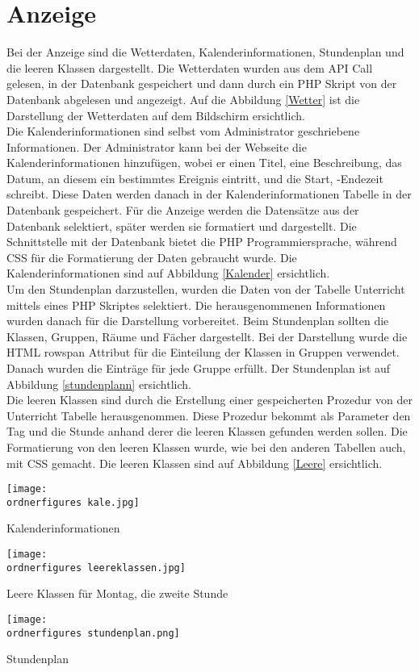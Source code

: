 \section{Anzeige}
Bei der Anzeige sind die Wetterdaten, Kalenderinformationen, Stundenplan und die leeren Klassen dargestellt. Die Wetterdaten wurden aus dem API Call gelesen, in der Datenbank gespeichert und dann durch ein PHP Skript von der Datenbank abgelesen und angezeigt. Auf die Abbildung \ref{Wetter} ist die Darstellung der Wetterdaten auf dem Bildschirm ersichtlich. \\
Die Kalenderinformationen sind selbst vom Administrator geschriebene Informationen. Der Administrator kann bei der Webseite die Kalenderinformationen hinzuf\"ugen, wobei er einen Titel, eine Beschreibung, das Datum, an diesem ein bestimmtes Ereignis eintritt, und die Start, -Endezeit schreibt. Diese Daten werden danach in der Kalenderinformationen Tabelle in der Datenbank gespeichert. F\"ur die Anzeige werden die Datens\"atze aus der Datenbank selektiert, sp\"ater werden sie formatiert und dargestellt. Die Schnittstelle mit der Datenbank bietet die PHP Programmiersprache, w\"ahrend CSS f\"ur die Formatierung der Daten gebraucht wurde. Die Kalenderinformationen sind auf Abbildung \ref{Kalender} ersichtlich. \\
Um den Stundenplan darzustellen, wurden die Daten von der Tabelle Unterricht mittels eines PHP Skriptes selektiert. Die herausgenommenen Informationen wurden danach f\"ur die Darstellung vorbereitet.  Beim Stundenplan sollten die Klassen, Gruppen, R\"aume und F\"acher dargestellt. Bei der Darstellung wurde die HTML rowspan Attribut f\"ur die Einteilung der Klassen in Gruppen verwendet. Danach wurden die Eintr\"age f\"ur jede Gruppe erf\"ullt. Der Stundenplan ist auf Abbildung \ref{stundenplann} ersichtlich. \\
Die leeren Klassen sind durch die Erstellung einer gespeicherten Prozedur von der Unterricht Tabelle herausgenommen. Diese Prozedur bekommt als Parameter den Tag und die Stunde anhand derer die leeren Klassen gefunden werden sollen. Die Formatierung von den leeren Klassen wurde, wie bei den anderen Tabellen auch, mit CSS gemacht. Die leeren Klassen sind auf Abbildung \ref{Leere} ersichtlich. \\
\begin{center}
	\captionsetup{type=figure}
	\texttt{[image: \\ordnerfigures kale.jpg]}
	\caption{Kalenderinformationen}
	\label{Kalender}
\end{center}
\begin{center}
	\captionsetup{type=figure}
	\texttt{[image: \\ordnerfigures leereklassen.jpg]}
	\caption{Leere Klassen f\"ur Montag, die zweite Stunde}
	\label{Leere} 
\end{center}
\begin{center}
	\captionsetup{type=figure}
	\texttt{[image: \\ordnerfigures stundenplan.png]}
	\caption{Stundenplan}
	\label{stundenplann} 
\end{center}
